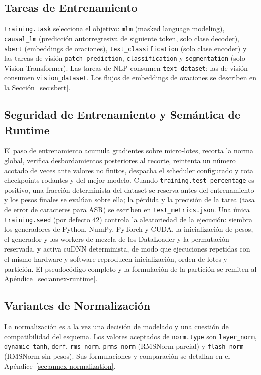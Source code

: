 \subsection{Tareas de Entrenamiento}

\texttt{training.task} selecciona el objetivo: \texttt{mlm} (masked language modeling), \texttt{causal\_lm} (predicción autorregresiva de siguiente token, solo clase decoder), \texttt{sbert} (embeddings de oraciones), \texttt{text\_classification} (solo clase encoder) y las tareas de visión \texttt{patch\_prediction}, \texttt{classification} y \texttt{segmentation} (solo Vision Transformer). Las tareas de NLP consumen \texttt{text\_dataset}; las de visión consumen \texttt{vision\_dataset}. Los flujos de embeddings de oraciones se describen en la Sección~\ref{sec:sbert}.

\subsection{Seguridad de Entrenamiento y Semántica de Runtime}

El paso de entrenamiento acumula gradientes sobre micro-lotes, recorta la norma global, verifica desbordamientos posteriores al recorte, reintenta un número acotado de veces ante valores no finitos, despacha el scheduler configurado y rota checkpoints rodantes y del mejor modelo. Cuando \texttt{training.test\_percentage} es positivo, una fracción determinista del dataset se reserva antes del entrenamiento y los pesos finales se evalúan sobre ella; la pérdida y la precisión de la tarea (tasa de error de caracteres para ASR) se escriben en \texttt{test\_metrics.json}. Una única \texttt{training.seed} (por defecto \(42\)) controla la aleatoriedad de la ejecución: siembra los generadores de Python, NumPy, PyTorch y CUDA, la inicialización de pesos, el generador y los workers de mezcla de los DataLoader y la permutación reservada, y activa cuDNN determinista, de modo que ejecuciones repetidas con el mismo hardware y software reproducen inicialización, orden de lotes y partición. El pseudocódigo completo y la formulación de la partición se remiten al Apéndice~\ref{sec:annex-runtime}.

\subsection{Variantes de Normalización}
\label{sec:normalization}

La normalización es a la vez una decisión de modelado y una cuestión de compatibilidad del esquema. Los valores aceptados de \texttt{norm.type} son \texttt{layer\_norm}, \texttt{dynamic\_tanh}, \texttt{derf}, \texttt{rms\_norm}, \texttt{prms\_norm} (RMSNorm parcial) y \texttt{flash\_norm} (RMSNorm sin pesos). Sus formulaciones y comparación se detallan en el Apéndice~\ref{sec:annex-normalization}.

